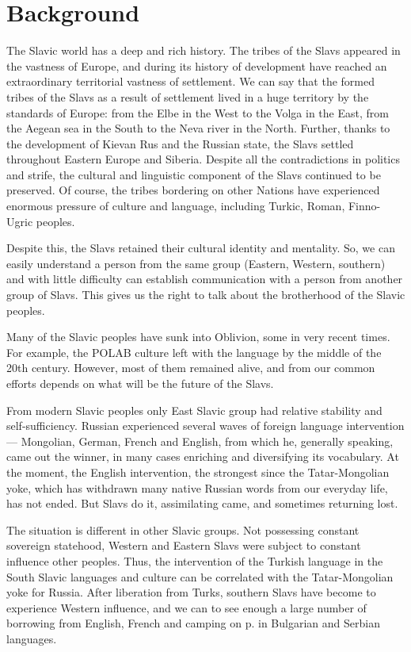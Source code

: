 \chapter{Background}

The Slavic world has a deep and rich history. The tribes of the Slavs appeared in the vastness of Europe, and during its history of development have reached an extraordinary territorial vastness of settlement. We can say that the formed tribes of the Slavs as a result of settlement lived in a huge territory by the standards of Europe: from the Elbe in the West to the Volga in the East, from the Aegean sea in the South to the Neva river in the North. Further, thanks to the development of Kievan Rus and the Russian state, the Slavs settled throughout Eastern Europe and Siberia. Despite all the contradictions in politics and strife, the cultural and linguistic component of the Slavs continued to be preserved. Of course, the tribes bordering on other Nations have experienced enormous pressure of culture and language, including Turkic, Roman, Finno-Ugric peoples.

Despite this, the Slavs retained their cultural identity and mentality. So, we can easily understand a person from the same group (Eastern, Western, southern) and with little difficulty can establish communication with a person from another group of Slavs. This gives us the right to talk about the brotherhood of the Slavic peoples.

Many of the Slavic peoples have sunk into Oblivion, some in very recent times. For example, the POLAB culture left with the language by the middle of the 20th century. However, most of them remained alive, and from our common efforts depends on what will be the future of the Slavs.

From modern Slavic peoples only East Slavic group had relative stability and self-sufficiency. Russian experienced several waves of foreign language intervention — Mongolian, German, French and English, from which he, generally speaking, came out the winner, in many cases enriching and diversifying its vocabulary. At the moment, the English intervention, the strongest since the Tatar-Mongolian yoke, which has withdrawn many native Russian words from our everyday life, has not ended. But Slavs do it, assimilating came, and sometimes returning lost.

The situation is different in other Slavic groups. Not possessing constant sovereign statehood, Western and Eastern Slavs were subject to constant influence other peoples. Thus, the intervention of the Turkish language in the South Slavic languages and culture can be correlated with the Tatar-Mongolian yoke for Russia. After liberation from Turks, southern Slavs have become to experience Western influence, and we can to see enough a large number of borrowing from English, French and camping on p. in Bulgarian and Serbian languages.

